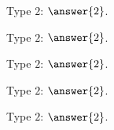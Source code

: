 \documentclass{ximera}
\begin{document}
\begin{question}
  Type $2$: $\answer{2}$.
  \begin{question}
  Type $2$: $\answer{2}$.
  \end{question}
\end{question}



\begin{exploration}
  Type $2$: $\answer{2}$.
\end{exploration}

\begin{exploration}
  Type $2$: $\answer{2}$.
  \begin{exploration}
  Type $2$: $\answer{2}$.
  \end{exploration}
\end{exploration}





\begin{latexProblemContent}
	\lipsum[1]
\end{latexProblemContent}
\end{document}
